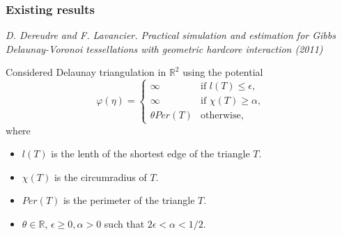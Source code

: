 \documentclass[c, 10pt]{beamer}
\begin{document}
\begin{frame}\frametitle{Existing results}
	\textit{D. Dereudre and F. Lavancier. Practical simulation and estimation for Gibbs Delaunay-Voronoi tessellations with geometric hardcore interaction (2011)}

	Considered Delaunay triangulation in $\mathbb R^2$ using the potential
\begin{equation*}
	\varphi(\eta) = 
\left\{
    \begin{array}{ll}
        \infty & \mbox{if } l(T)\leq \epsilon, \\
        \infty & \mbox{if } \chi(T)\geq \alpha, \\
        \theta Per(T) & \mbox{otherwise, }
    \end{array}
\right. 
\end{equation*}
where
\begin{itemize}
\item $l(T)$ is the lenth of the shortest edge of the triangle $T$.
\item $\chi(T)$ is the circumradius of $T$.
\item $Per(T)$ is the perimeter of the triangle $T$.
\item $\theta \in \mathbb R$, $\epsilon \geq 0, \alpha > 0$ such that $2\epsilon < \alpha < 1/2$.
\end{itemize}


\end{frame}
\end{document}
